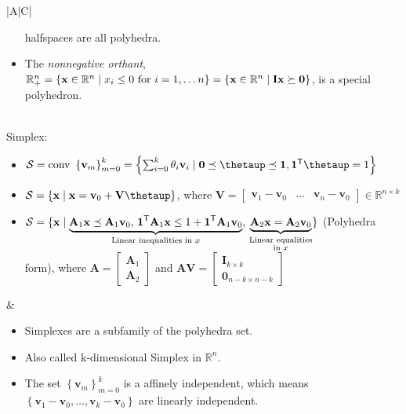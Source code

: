\documentclass{article}
\newcommand{\trans}{\mathsf{T}}
\begin{document}
\begin{table}[ht!]
\begin{tabularx}{\textwidth}{|A|C|}
\begin{itemize}[leftmargin=*]
    halfspaces are all polyhedra.
    \item The \emph{nonnegative orthant}, \(\mathbb{R}_{+}^{n} = \left\{ \mathbf{x} \in \mathbb{R}^n \mid x_i \leq 0 \textnormal{ for } i=1,\dots n \right\} = \left\{ \mathbf{x} \in \mathbb{R}^n \mid \mathbf{Ix}  \succeq \mathbf{0}\right\}\), is a special polyhedron.
\end{itemize}\\
\hline
Simplex:
\begin{itemize}[leftmargin=*]
    \item \(\mathcal{S} = \textnormal{conv }\left\{ \mathbf{v}_m \right\}_{m=0}^{k} = \left\{ \sum_{i=0}^{k} \theta_i \mathbf{v}_i \mid \mathbf{0} \preceq \boldsymbol{\thetaup} \preceq \mathbf{1}, \mathbf{1}^\trans \boldsymbol{\thetaup} = 1 \right\}\)
    \item \(\mathcal{S} = \left\{ \mathbf{x} \mid \mathbf{x} = \mathbf{v}_0 + \mathbf{V} \boldsymbol{\thetaup} \right\}\), where \(\mathbf{V} = \begin{bmatrix}
        \mathbf{v}_1 - \mathbf{v}_0 & \dots & \mathbf{v}_n - \mathbf{v}_0
    \end{bmatrix} \in \mathbb{R}^{n \times k}\)
    \item \(\mathcal{S} = \{ \mathbf{x} \mid \underbrace{\mathbf{A}_1 \mathbf{x} \preceq \mathbf{A}_1 \mathbf{v}_0, \, \mathbf{1}^\trans \mathbf{A}_1 \mathbf{x} \leq 1 + \mathbf{1}^\trans\mathbf{A}_1 \mathbf{v}_0}_{\textnormal{Linear inequalities in } x}, \, \underbrace{\mathbf{A}_2 \mathbf{x} = \mathbf{A}_2 \mathbf{v}_0}_{\substack{\text{\textnormal{Linear equalities}} \\\textnormal{in } x}} \}\) (Polyhedra form), where \(\mathbf{A} = \begin{bmatrix}
        \mathbf{A}_1 \\ \mathbf{A}_2
    \end{bmatrix}\) and \(\mathbf{AV} = \begin{bmatrix}
        \mathbf{I}_{k\times k}\\
        \mathbf{0}_{n-k \times n-k}
    \end{bmatrix}\)
\end{itemize} & \vspace{-3.5ex}
\begin{itemize}[leftmargin=*]
    \item Simplexes are a subfamily of the polyhedra set.
    \item Also called k-dimensional Simplex in \(\mathbb{R}^{n}\).
    \item The set \(\left\{ \mathbf{v}_m \right\}_{m=0}^{k}\) is a affinely independent, which means \(\left\{ \mathbf{v}_1-\mathbf{v}_0, \dots, \mathbf{v}_k-\mathbf{v}_0 \right\}\) are linearly independent.

\end{itemize}
\end{tabularx}
\end{table}
\end{document}
